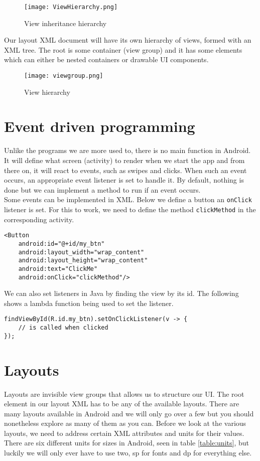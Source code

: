 \begin{figure}[H]
\centering
\texttt{[image: ViewHierarchy.png]}
\caption{View inheritance hierarchy}
\label{fig:inherhia}
\end{figure}

Our layout XML document will have its own hierarchy of views, formed with an XML tree. The root is some container (view group) and it has some elements which can either be nested containers or drawable UI components. 

\begin{figure}[H]
  \centering
  \texttt{[image: viewgroup.png]}
  \caption{View hierarchy}
  \label{fig:viewhia}
\end{figure}

\section{Event driven programming}
Unlike the programs we are more used to, there is no main function in Android. It will define what screen (activity) to render when we start the app and from there on, it will react to events, such as swipes and clicks. When such an event occurs, an appropriate event listener is set to handle it. By default, nothing is done but we can implement a method to run if an event occurs.\\

Some events can be implemented in XML. Below we define a button an \texttt{onClick} listener is set. For this to work, we need to define the method \texttt{clickMethod} in the corresponding activity. 
\begin{lstlisting}[style=A_XML]
<Button
    android:id="@+id/my_btn"
    android:layout_width="wrap_content"
    android:layout_height="wrap_content"
    android:text="ClickMe" 
    android:onClick="clickMethod"/>
\end{lstlisting}
We can also set listeners in Java by finding the view by its id. The following shows a lambda function being used to set the  listener.
\begin{lstlisting}[style=A_Java]
findViewById(R.id.my_btn).setOnClickListener(v -> {
    // is called when clicked
});
\end{lstlisting}

\section{Layouts}
Layouts are invisible view groups that allows us to structure our UI. The root element in our layout XML has to be any of the available layouts. There are many layouts available in Android and we will only go over a few but you should nonetheless explore as many of them as you can. Before we look at the various layouts, we need to address certain XML attributes and units for their values. There are six different units for sizes in Android, seen in table \ref{table:units}, but luckily we will only ever have to use two, sp for fonts and dp for everything else.

